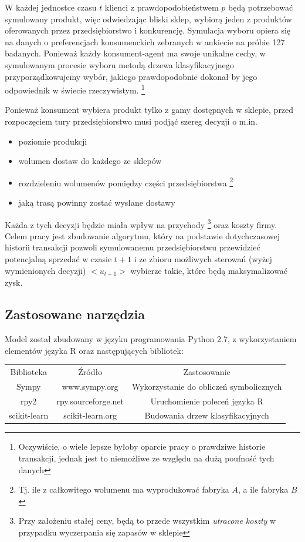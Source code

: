 \documentclass{article}
\begin{document}
W każdej jednostce czasu $ t $ klienci z prawdopodobieństwem $ p $ będą potrzebować symulowany produkt, więc odwiedzając bliski sklep, wybiorą jeden z produktów oferowanych przez przedsiębiorstwo i konkurencję. Symulacja wyboru opiera się na danych o preferencjach konsumenckich zebranych w ankiecie na próbie 127 badanych. Ponieważ każdy konsument-agent ma swoje unikalne cechy, w symulowanym procesie wyboru metodą drzewa klasyfikacyjnego przyporządkowujemy wybór, jakiego prawdopodobnie dokonał by jego odpowiednik w świecie rzeczywistym. \footnote{Oczywiście, o wiele lepsze byłoby oparcie pracy o prawdziwe historie transakcji, jednak jest to niemożliwe ze względu na dużą poufność tych danych}

Ponieważ konsument wybiera produkt tylko z gamy dostępnych w sklepie, przed rozpoczęciem tury przedsiębiorstwo musi podjąć szereg decyzji o m.in.
	\begin{itemize}
		\item poziomie produkcji
		\item wolumen dostaw do każdego ze sklepów
		\item rozdzieleniu wolumenów pomiędzy części przedsiębiorstwa  \footnote{Tj. ile z całkowitego wolumenu ma wyprodukować fabryka $A$, a ile fabryka $B$}
	 	\item jaką trasą powinny zostać wysłane dostawy
	\end{itemize}

Każda z tych decyzji będzie miała wpływ na przychody \footnote{Przy założeniu stałej ceny, będą to przede wszystkim \textit{utracone koszty} w przypadku wyczerpania się zapasów w sklepie} oraz koszty firmy. Celem pracy jest zbudowanie algorytmu, który na podstawie dotychczasowej historii transakcji pozwoli symulowanemu przedsiębiorstwu przewidzieć potencjalną sprzedać w czasie $ t +1 $ i ze zbioru możliwych sterowań (wyżej wymienionych decyzji) $<u_{t+1}>$ wybierze takie, które będą maksymalizować zysk. 

\subsection{Zastosowane narzędzia}

Model został zbudowany w języku programowania Python 2.7, z wykorzystaniem elementów języka R oraz następujących bibliotek: 

\begin{center}
\begin{tabular}{ c c c }
 Biblioteka & Źródło & Zastosowanie \\ 
 Sympy & www.sympy.org & Wykorzystanie do obliczeń symbolicznych \\  
 rpy2 & rpy.sourceforge.net & Uruchomienie poleceń języka R   \\
 scikit-learn & scikit-learn.org & Budowania drzew klasyfikacyjnych
\end{tabular}
\end{center}
\end{document}
